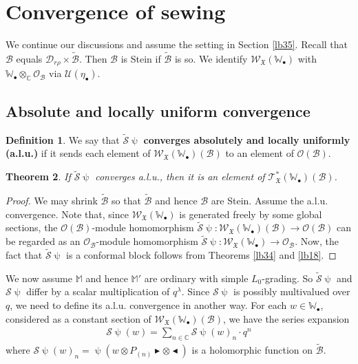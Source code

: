 \documentclass[12pt,a4paper,notitlepage]{article}
\theoremstyle{definition}
\newtheorem{df}{Definition}[section]
\theoremstyle{plain}
\newtheorem{thm}[df]{Theorem}
\newcommand{\fk}{\mathfrak}
\newcommand{\mc}{\mathcal}
\newcommand{\wtd}{\widetilde}
\newcommand{\scr}{\mathscr}
\newcommand{\blt}{\bullet}
\newcommand{\Wbb}{\mathbb W}
\newcommand{\Mbb}{\mathbb M}
\newcommand{\Cbb}{\mathbb C}
\newcommand{\btl}{\blacktriangleleft}
\newcommand{\btr}{\blacktriangleright}
\numberwithin{equation}{section}
\begin{document}
\section{Convergence of sewing}\label{lb52}




We continue our discussions and assume the setting in Section \ref{lb35}. Recall that $\mc B$ equals $\mc D_{r\rho}\times\wtd{\mc B}$. Then $\mc B$ is Stein if  $\wtd{\mc B}$ is so. We identify $\scr W_{\fk X}(\Wbb_\blt)$ with $\Wbb_\blt\otimes_\Cbb\scr O_{\mc B}$ via $\mc U(\eta_\blt)$.



\subsection*{Absolute and locally uniform convergence}



\begin{df}
We say that $\wtd{\mc S}\uppsi$  \textbf{converges absolutely and locally uniformly (a.l.u.)} if it sends each element of $\scr W_{\fk X}(\Wbb_\blt)(\mc B)$ to an element of $\scr O(\mc B)$. 
\end{df}



\begin{thm}\label{lb47}
If  $\wtd{\mc S}\uppsi$  converges a.l.u., then it is an element  of $\scr T_{\fk X}^*(\Wbb_\blt)(\mc B)$.
\end{thm}



\begin{proof}
We may shrink $\wtd{\mc B}$ so that $\wtd{\mc B}$ and hence $\mc B$ are Stein. Assume the a.l.u. convergence. Note that, since $\scr W_{\fk X}(\Wbb_\blt)$ is generated freely by some global sections, the $\scr O(\mc B)$-module homomorphism  $\wtd{\mc S}\uppsi:\scr W_{\fk X}(\Wbb_\blt)(\mc B)\rightarrow\scr O(\mc B)$ can be regarded as an $\scr O_{\mc B}$-module homomorphism $\wtd{\mc S}\uppsi:\scr W_{\fk X}(\Wbb_\blt)\rightarrow\scr O_{\mc B}$.  Now, the fact that $\wtd{\mc S}\uppsi$ is a conformal block follows  from Theorems \ref{lb34} and \ref{lb18}. 
\end{proof}



We now assume $\Mbb$ and hence $\Mbb'$ are ordinary with simple $L_0$-grading. So $\wtd{\mc S}\uppsi$ and $\mc S\uppsi$ differ by a scalar multiplication of $q^\lambda$. Since $\mc S\uppsi$ is possibly multivalued over $q$, we need to define its a.l.u. convergence in another way. For each $w\in \Wbb_\blt$, considered as a constant section of $\scr W_{\fk X}(\Wbb_\blt)(\mc B)$, we have the series expansion
\begin{align*}
\mc S\uppsi(w)=\sum_{n\in \Cbb}\mc S\uppsi(w)_n\cdot q^n 
\end{align*}
where  $\mc S\uppsi(w)_n=\uppsi(w\otimes P_{(n)}\btr\otimes\btl)$ is a holomorphic function on $\wtd{\mc B}$. 
\end{document}
